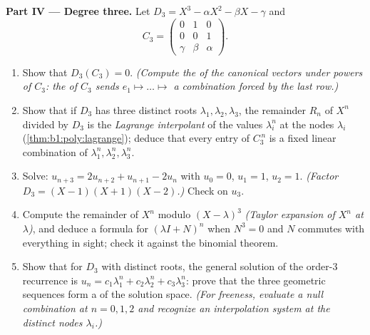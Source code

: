 \begin{problem}
\medskip
\noindent\textbf{Part IV --- Degree three.} Let $D_3 = X^3 -
\alpha X^2 - \beta X - \gamma$ and
\[
C_3 = \begin{pmatrix} 0 & 1 & 0\\ 0 & 0 & 1\\ \gamma & \beta &
\alpha \end{pmatrix}.
\]
\begin{enumerate}[resume]
  \item Show that $D_3(C_3) = 0$. \emph{(Compute the  of
        the canonical  vectors under powers of $C_3$: the
         of $C_3$ sends $e_1 \mapsto \dots \mapsto$ a
        combination forced by the last row.)}
  \item Show that if $D_3$ has three distinct roots $\lambda_1,
        \lambda_2, \lambda_3$, the remainder $R_n$ of $X^n$
        divided by $D_3$ is the \emph{Lagrange interpolant} of
        the values $\lambda_i^n$ at the nodes $\lambda_i$
        (\cref{thm:b1:poly:lagrange}); deduce that every entry
        of $C_3^{\,n}$ is a fixed linear combination of
        $\lambda_1^n, \lambda_2^n, \lambda_3^n$.
  \item Solve: $u_{n+3} = 2u_{n+2} + u_{n+1} - 2u_n$ with $u_0 =
        0$, $u_1 = 1$, $u_2 = 1$. \emph{(Factor $D_3 = (X - 1)(X
        + 1)(X - 2)$.)} Check on $u_3$.
  \item Compute the remainder of $X^n$ modulo $(X -
        \lambda)^3$ \emph{(Taylor expansion of $X^n$ at
        $\lambda$)}, and deduce a formula for $(\lambda I +
        N)^n$ when $N^3 = 0$ and $N$ commutes with everything in
        sight; check it against the binomial theorem.
  \item Show that for $D_3$ with distinct roots, the general
        solution of the order-$3$ recurrence is $u_n = c_1
        \lambda_1^n + c_2\lambda_2^n + c_3\lambda_3^n$: prove
        that the three geometric sequences form a  of the
        solution space. \emph{(For freeness, evaluate a null
        combination at $n = 0, 1, 2$ and recognize an
        interpolation system at the distinct nodes
        $\lambda_i$.)}
\end{enumerate}


\end{problem}
